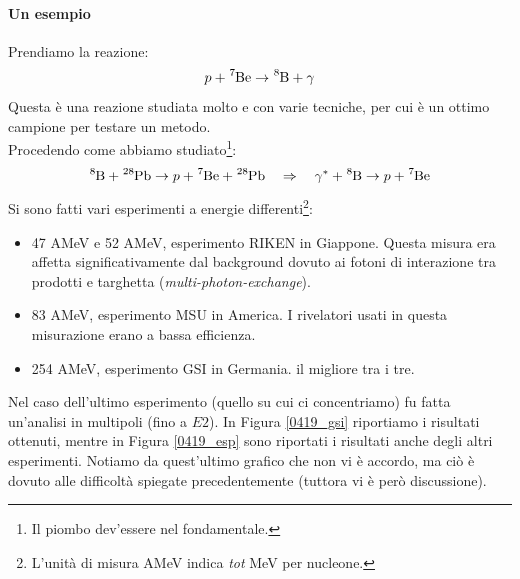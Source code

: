\paragraph{Un esempio} Prendiamo la reazione:
$$p+\ce{^7Be} \to \ce{^8B}+\gamma$$
Questa è una reazione studiata molto e con varie tecniche, per cui è un ottimo campione per testare un metodo.\\
Procedendo come abbiamo studiato\footnote{Il piombo dev'essere nel fondamentale.}:%
$$\ce{^8B} + \ce{^{28}Pb} \to p +  \ce{^7Be} + \ce{^{28}Pb} \quad \Rightarrow \quad \gamma^* + \ce{^8B} \to p+ \ce{^7Be}$$
Si sono fatti vari esperimenti a energie differenti\footnote{L'unità di misura AMeV indica \textit{tot} MeV per nucleone.}:
\begin{itemize}
	\item 47 AMeV e 52 AMeV, esperimento RIKEN in Giappone. Questa misura era affetta significativamente dal background dovuto ai fotoni di interazione tra prodotti e targhetta (\textit{multi-photon-exchange}).
	\item 83 AMeV, esperimento MSU in America. I rivelatori usati in questa misurazione erano a bassa efficienza.
	\item 254 AMeV, esperimento GSI in Germania.  il migliore tra i tre.
\end{itemize}
\noindent Nel caso dell'ultimo esperimento (quello su cui ci concentriamo) fu fatta un'analisi in multipoli (fino a $E2$). In Figura \ref{0419_gsi} riportiamo i risultati ottenuti, mentre in Figura \ref{0419_esp} sono riportati i risultati anche degli altri esperimenti. Notiamo da quest'ultimo grafico che non vi è accordo, ma ciò è dovuto alle difficoltà spiegate precedentemente (tuttora vi è però discussione).

